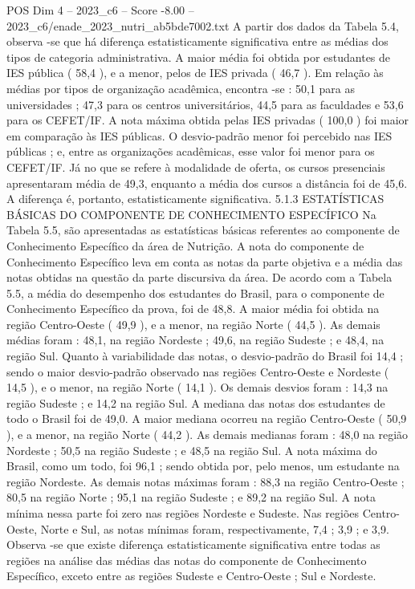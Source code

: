 \begin{textsample}{POS Dim 4 – 2023\_c6 – Score -8.00 – 2023\_c6/enade\_2023\_nutri\_ab5bde7002.txt}
A partir dos dados da Tabela 5.4, observa -se que há diferença estatisticamente significativa entre as médias dos tipos de categoria administrativa.
A maior média foi obtida por estudantes de IES pública ( 58,4 ), e a menor, pelos de IES privada ( 46,7 ).
Em relação às médias por tipos de organização acadêmica, encontra -se : 50,1 para as universidades ; 47,3 para os centros universitários, 44,5 para as faculdades e 53,6 para os CEFET/IF.
A nota máxima obtida pelas IES privadas ( 100,0 ) foi maior em comparação às IES públicas.
O desvio-padrão menor foi percebido nas IES públicas ; e, entre as organizações acadêmicas, esse valor foi menor para os CEFET/IF.
Já no que se refere à modalidade de oferta, os cursos presenciais apresentaram média de 49,3, enquanto a média dos cursos a distância foi de 45,6.
A diferença é, portanto, estatisticamente significativa. 5.1.3 ESTATÍSTICAS BÁSICAS DO COMPONENTE DE CONHECIMENTO ESPECÍFICO Na Tabela 5.5, são apresentadas as estatísticas básicas referentes ao componente de Conhecimento Específico da área de Nutrição.
A nota do componente de Conhecimento Específico leva em conta as notas da parte objetiva e a média das notas obtidas na questão da parte discursiva da área.
De acordo com a Tabela 5.5, a média do desempenho dos estudantes do Brasil, para o componente de Conhecimento Específico da prova, foi de 48,8.
A maior média foi obtida na região Centro-Oeste ( 49,9 ), e a menor, na região Norte ( 44,5 ).
As demais médias foram : 48,1, na região Nordeste ; 49,6, na região Sudeste ; e 48,4, na região Sul.
Quanto à variabilidade das notas, o desvio-padrão do Brasil foi 14,4 ; sendo o maior desvio-padrão observado nas regiões Centro-Oeste e Nordeste ( 14,5 ), e o menor, na região Norte ( 14,1 ).
Os demais desvios foram : 14,3 na região Sudeste ; e 14,2 na região Sul.
A mediana das notas dos estudantes de todo o Brasil foi de 49,0.
A maior mediana ocorreu na região Centro-Oeste ( 50,9 ), e a menor, na região Norte ( 44,2 ).
As demais medianas foram : 48,0 na região Nordeste ; 50,5 na região Sudeste ; e 48,5 na região Sul.
A nota máxima do Brasil, como um todo, foi 96,1 ; sendo obtida por, pelo menos, um estudante na região Nordeste.
As demais notas máximas foram : 88,3 na região Centro-Oeste ; 80,5 na região Norte ; 95,1 na região Sudeste ; e 89,2 na região Sul.
A nota mínima nessa parte foi zero nas regiões Nordeste e Sudeste.
Nas regiões Centro-Oeste, Norte e Sul, as notas mínimas foram, respectivamente, 7,4 ; 3,9 ; e 3,9.
Observa -se que existe diferença estatisticamente significativa entre todas as regiões na análise das médias das notas do componente de Conhecimento Específico, exceto entre as regiões Sudeste e Centro-Oeste ; Sul e Nordeste.

\end{textsample}

